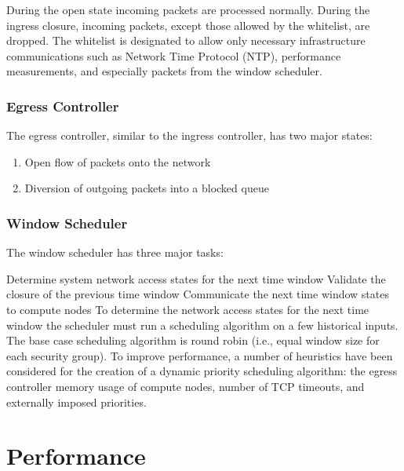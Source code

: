 \documentclass[oneside,12pt]{memoir}
\begin{document}
During the open state incoming packets are processed normally. During the ingress closure, incoming packets, except those allowed by the whitelist, are dropped. The whitelist is designated to allow only necessary infrastructure communications such as Network Time Protocol (NTP), performance measurements, and especially packets from the window scheduler.
\subsection{Egress Controller}
The egress controller, similar to the ingress controller, has two major states:
\begin{enumerate} \itemsep1pt \parskip0pt 
\item Open flow of packets onto the network
\item Diversion of outgoing packets into a blocked queue
\end{enumerate}

\subsection{Window Scheduler}
The window scheduler has three major tasks: 

Determine system network access states for the next time window 
Validate the closure of the previous time window
Communicate the next time window states to compute nodes
To determine the network access states for the next time window the scheduler must run a scheduling algorithm on a few historical inputs. The base case scheduling algorithm is round robin (i.e., equal window size for each security group). To improve performance, a number of heuristics have been considered for the creation of a dynamic priority scheduling algorithm: the egress controller memory usage of compute nodes, number of TCP timeouts, and externally imposed priorities. 
\chapter{Performance}
\end{document}
